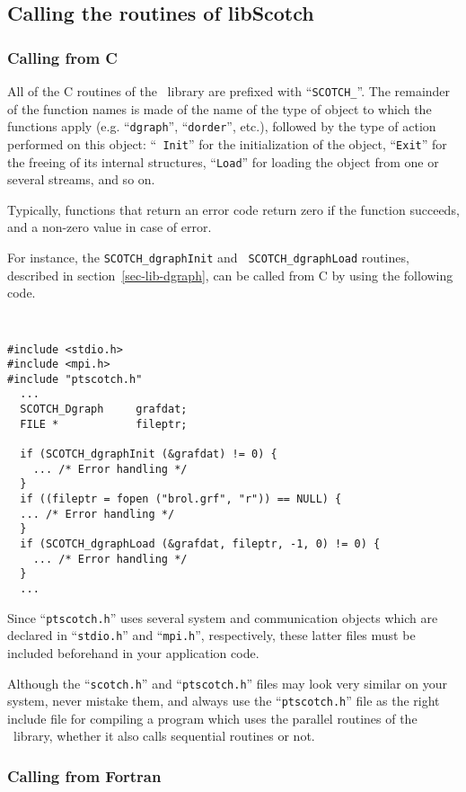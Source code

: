 \subsection{Calling the routines of {\sc libScotch}}

\subsubsection{Calling from C}

All of the C routines of the \libscotch\ library are prefixed with
``{\tt SCOTCH\_}''. The remainder of the function names is made of the
name of the type of object to which the functions apply (e\@.g\@.
``{\tt dgraph}'', ``{\tt dorder}'', etc.),
followed by the type of action performed on this object: ``{\tt
Init}'' for the initialization of the object, ``{\tt Exit}'' for the
freeing of its internal structures, ``{\tt Load}'' for loading the
object from one or several streams, and so on.

Typically, functions that return an error code return zero if the
function succeeds, and a non-zero value in case of error.

For instance, the {\tt SCOTCH\_\lbt dgraph\lbt Init} and {\tt
SCOTCH\_\lbt dgraph\lbt Load} routines, described in
section~\ref{sec-lib-dgraph}, can be called from C by using the
following code.
{\tt
\begin{verbatim}
#include <stdio.h>
#include <mpi.h>
#include "ptscotch.h"
  ...
  SCOTCH_Dgraph     grafdat;
  FILE *            fileptr;

  if (SCOTCH_dgraphInit (&grafdat) != 0) {
    ... /* Error handling */
  }
  if ((fileptr = fopen ("brol.grf", "r")) == NULL) {
  ... /* Error handling */
  }
  if (SCOTCH_dgraphLoad (&grafdat, fileptr, -1, 0) != 0) {
    ... /* Error handling */
  }
  ...
\end{verbatim}
}

Since ``{\tt ptscotch.h}'' uses several system and communication
objects which are declared in ``{\tt stdio.h}'' and ``{\tt mpi.h}'',
respectively, these latter files must be included beforehand
in your application code.

Although the ``{\tt scotch.h}'' and ``{\tt ptscotch.h}'' files may
look very similar on your system, never mistake them, and always use
the ``{\tt ptscotch.h}'' file as the right include file for compiling
a program which uses the parallel routines of the \libscotch\ library,
whether it also calls sequential routines or not.

\subsubsection{Calling from Fortran}

